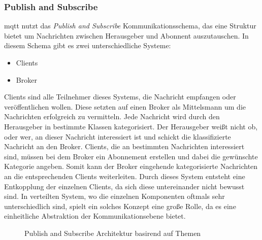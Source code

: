 \subsubsection{Publish and Subscribe}
\ac{mqtt} nutzt das \textit{Publish and Subscribe} Kommunikationsschema, das eine Struktur bietet um Nachrichten zwischen Herausgeber und Abonnent auszutauschen. In diesem Schema gibt es zwei unterschiedliche Systeme:
\begin{itemize}
    \item Clients
    \item Broker
\end{itemize}
Clients sind alle Teilnehmer dieses Systems, die Nachricht empfangen oder veröffentlichen wollen. Diese setzten auf einen Broker als Mittelsmann um die Nachrichten erfolgreich zu vermitteln.\cite{teamGettingStartedMQTT} Jede Nachricht wird durch den Herausgeber in bestimmte Klassen kategorisiert. Der Herausgeber wei{\ss}t nicht ob, oder wer, an dieser Nachricht interessiert ist und schickt die klassifizierte Nachricht an den Broker. Clients, die an bestimmten Nachrichten interessiert sind, müssen bei dem Broker ein Abonnement erstellen und dabei die gewünschte Kategorie angeben. Somit kann der Broker eingehende kategorisierte Nachrichten an die entsprechenden Clients weiterleiten. Durch dieses System entsteht eine Entkopplung der einzelnen Clients, da sich diese untereinander nicht bewusst sind.\cite{EverythingYouNeed} In verteilten System, wo die einzelnen Komponenten oftmals sehr unterschiedlich sind, spielt ein solches Konzept eine gro{\ss}e Rolle, da es eine einheitliche Abstraktion der Kommunikationsebene bietet.\cite{domingusDistributedSystemsIntroduction2020}\\
\begin{figure}
    \centering
    \caption{Publish and Subscribe Architektur basirend auf Themen}
    \label{fig:publish-subscribe}
\end{figure}

